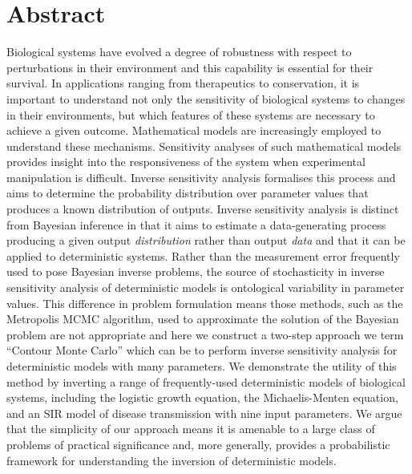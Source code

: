 \documentclass[10pt,letterpaper]{article}
\begin{document}

\newpage
\section{Abstract}

Biological systems have evolved a degree of robustness with respect to perturbations in their environment and this capability is essential for their survival. In applications ranging from therapeutics to conservation, it is important to understand not only the sensitivity of biological systems to changes in their environments, but which features of these systems are necessary to achieve a given outcome. Mathematical models are increasingly employed to understand these mechanisms. Sensitivity analyses of such mathematical models provides insight into the responsiveness of the system when experimental manipulation is difficult. Inverse sensitivity analysis formalises this process and aims to determine the probability distribution over parameter values that produces a known distribution of outputs. Inverse sensitivity analysis is distinct from Bayesian inference in that it aims to estimate a data-generating process producing a given output \textit{distribution} rather than output \textit{data} and that it can be applied to deterministic systems. Rather than the measurement error frequently used to pose Bayesian inverse problems, the source of stochasticity in inverse sensitivity analysis of deterministic models is ontological variability in parameter values. This difference in problem formulation means those methods, such as the Metropolis MCMC algorithm, used to approximate the solution of the Bayesian problem are not appropriate and here we construct a two-step approach we term ``Contour Monte Carlo'' which can be to perform inverse sensitivity analysis for deterministic models with many parameters. We demonstrate the utility of this method by inverting a range of frequently-used deterministic models of biological systems, including the logistic growth equation, the Michaelis-Menten equation, and an SIR model of disease transmission with nine input parameters. We argue that the simplicity of our approach means it is amenable to a large class of problems of practical significance and, more generally, provides a probabilistic framework for understanding the inversion of deterministic models.
\end{document}
